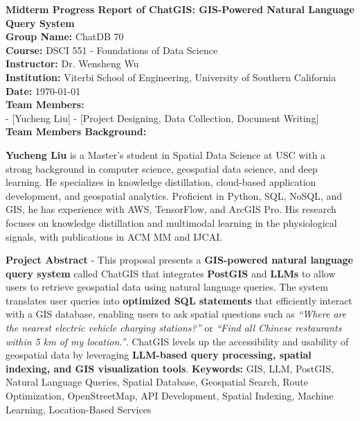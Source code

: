 \documentclass{article}
\begin{document}
\begin{titlepage}
    \centering
    \vspace*{2cm}
    {\Huge \textbf{Midterm Progress Report of ChatGIS: GIS-Powered Natural Language Query System}} \\
    \vspace{1.5cm}
    \textbf{Group Name:} ChatDB 70 \\
    \textbf{Course:} DSCI 551 - Foundations of Data Science \\
    \textbf{Instructor:} Dr. Wensheng Wu \\
    \textbf{Institution:} Viterbi School of Engineering, University of Southern California \\
    \textbf{Date:} \today \\
    \vfill
    \textbf{Team Members:} \\
    - [Yucheng Liu] - [Project Designing, Data Collection, Document Writing] \\
    

    \vfill
    \textbf{Team Members Background:} \\
    \begin{justify}

        \textbf{Yucheng Liu} is a Master’s student in Spatial Data Science at USC with a strong background in computer science, geospatial data science, and deep learning. He specializes in knowledge distillation, cloud-based application development, and geospatial analytics. Proficient in Python, SQL, NoSQL, and GIS, he has experience with AWS, TensorFlow,  and ArcGIS Pro. His research focuses on knowledge distillation and multimodal learning in the physiological signals, with publications in ACM MM and IJCAI.
        
    \end{justify}

    \vfill
    \begin{justify}
        \textbf{Project Abstract} - This proposal presents a \textbf{GIS-powered natural language query system} called ChatGIS that integrates \textbf{PostGIS} and \textbf{LLMs} to allow users to retrieve geospatial data using natural language queries. The system translates user queries into \textbf{optimized SQL statements} that efficiently interact with a GIS database, enabling users to ask spatial questions such as \textit{``Where are the nearest electric vehicle charging stations?''} or \textit{``Find all Chinese restaurants within 5 km of my location.''}. ChatGIS levels up the accessibility and usability of geospatial data by leveraging \textbf{LLM-based query processing, spatial indexing, and GIS visualization tools}.
        \vfill
        \textbf{Keywords:} GIS, LLM, PostGIS, Natural Language Queries, Spatial Database, Geospatial Search, Route Optimization, OpenStreetMap, API Development, Spatial Indexing, Machine Learning, Location-Based Services
    \end{justify}

\end{titlepage}
\end{document}
